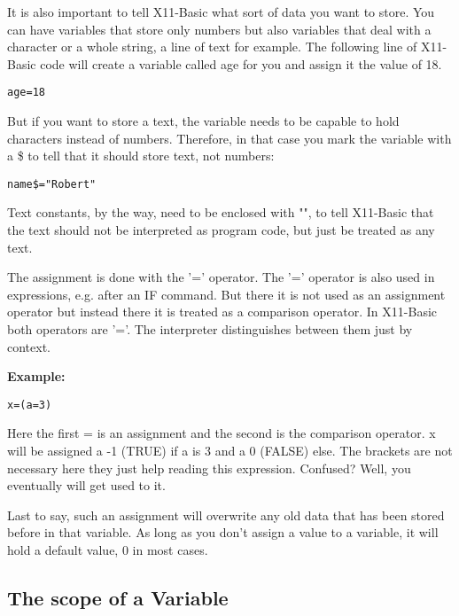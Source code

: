 It is also important to tell X11-Basic what sort of data you want to store. You
can have variables that store only numbers but also variables that deal with a
character or a whole string, a line of text for example. The following line of
X11-Basic code will create a variable called age for you and assign it the value
of 18.
\begin{mdframed}[hidealllines=true,backgroundcolor=blue!20]
\begin{verbatim}
age=18
\end{verbatim}
\end{mdframed}
But if you want to store a text, the variable needs to be capable to 
hold characters instead of numbers. Therefore, in that case you mark the 
variable with a \$ to tell that it should store text, not numbers:
\begin{mdframed}[hidealllines=true,backgroundcolor=blue!20]
\begin{verbatim}
name$="Robert"
\end{verbatim}
\end{mdframed}
Text constants, by the way, need to be enclosed with "", to tell X11-Basic that 
the text should not be interpreted as program code, but just be treated as any
text.

The assignment is done with the '=' operator. The '=' operator is also used in 
expressions, e.g. after an IF command. But there it is not used as an assignment 
operator but instead there it is treated as a comparison operator. In X11-Basic
both operators are '='. The interpreter distinguishes between them just by
context.
\begin{mdframed}[hidealllines=true,backgroundcolor=blue!20]
{\bf Example:}
\begin{verbatim}
x=(a=3)
\end{verbatim}
\end{mdframed}
Here the first = is an assignment and the second is the comparison operator.
x will be assigned a -1 (TRUE) if a is 3 and a 0 (FALSE) else. The brackets are 
not necessary here they just help reading this expression. Confused? Well, you 
eventually will get used to it.

Last to say, such an assignment will overwrite any old data that has been stored
before in that variable. As long as you don't assign a value to a variable, it
will hold a default value, 0 in most cases.

\subsection{The scope of a Variable}

